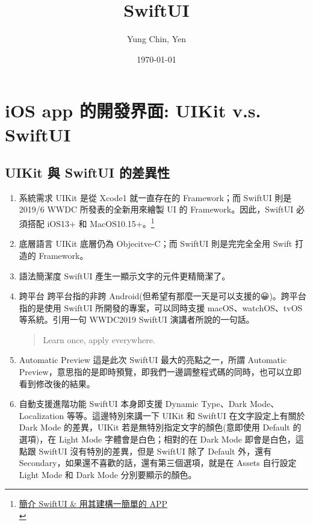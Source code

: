 \documentclass[a4paper,12pt]{article}
\author{Yung Chin, Yen}
\date{\today}
\title{SwiftUI}
\begin{document}
\maketitle
\tableofcontents

\newpage

\section{iOS app 的開發界面: UIKit v.s. SwiftUI}
\label{sec:orgd284981}
\subsection{UIKit 與 SwiftUI 的差異性}
\label{sec:orga0c7f6b}
\begin{enumerate}
\item 系統需求
\label{sec:org66dae18}
UIKit 是從 Xcode1 就一直存在的 Framework；而 SwiftUI 則是 2019/6 WWDC 所發表的全新用來繪製 UI 的 Framework。因此，SwiftUI 必須搭配 iOS13+ 和 MacOS10.15+。\footnote{\href{https://medium.com/@mikru168/swiftui-\%E6\%B7\%BA\%E7\%8E\%A9-swiftui-\%E7\%94\%A8\%E5\%85\%B6\%E5\%BB\%BA\%E6\%A7\%8B\%E4\%B8\%80\%E7\%B0\%A1\%E5\%96\%AE\%E7\%9A\%84-app-2f2477bd49d7}{簡介 SwiftUI \& 用其建構一簡單的 APP }\\}\\
\item 底層語言
\label{sec:orga7610bb}
UIKit 底層仍為 Objecitve-C；而 SwiftUI 則是完完全全用 Swift 打造的 Framework。\\
\item 語法簡潔度
\label{sec:org215195e}
SwiftUI 產生一顯示文字的元件更精簡潔了。\\
\item 跨平台
\label{sec:org64bf009}
跨平台指的非跨 Android(但希望有那麼一天是可以支援的😀)。跨平台指的是使用 SwiftUI 所開發的專案，可以同時支援 macOS、watchOS、tvOS 等系統。引用一句 WWDC2019 SwiftUI 演講者所說的一句話。\\
\begin{quote}
Learn once, apply everywhere.\\
\end{quote}
\item Automatic Preview
\label{sec:orgad6c8bc}
這是此次 SwiftUI 最大的亮點之一，所謂 Automatic Preview，意思指的是即時預覽，即我們一邊調整程式碼的同時，也可以立即看到修改後的結果。\\
\item 自動支援進階功能
\label{sec:orgc451dfa}
SwiftUI 本身即支援 Dynamic Type、Dark Mode、 Localization 等等。這邊特別來講一下 UIKit 和 SwiftUI 在文字設定上有關於 Dark Mode 的差異，UIKit 若是無特別指定文字的顏色(意即使用 Default 的選項)，在 Light Mode 字體會是白色；相對的在 Dark Mode 即會是白色，這點跟 SwiftUI 沒有特別的差異，但是 SwiftUI 除了 Default 外，還有 Secondary，如果還不喜歡的話，還有第三個選項，就是在 Assets 自行設定 Light Mode 和 Dark Mode 分別要顯示的顏色。\\

\end{enumerate}
\end{document}
